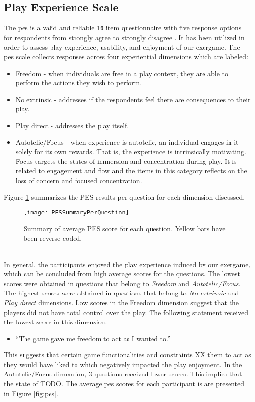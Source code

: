 \subsection{Play Experience Scale}
The \acrfull{pes} is a valid and reliable 16 item questionnaire with five response options for respondents from strongly agree to strongly disagree \cite{pavlas2012play}. It has been utilized in order to assess play experience, usability, and enjoyment of our exergame. The \gls{pes} scale collects responses across four experiential dimensions which are labeled: \begin{itemize}
\item Freedom - when individuals are free in a play context, they are able to perform the actions they wish to perform.
\item No extrinsic - addresses if the respondents feel there are consequences to their play.
\item Play direct - addresses the play itself.
\item Autotelic/Focus - when experience is autotelic, an individual engages in it solely for its own rewards. That is, the experience is intrinsically motivating.  Focus targets the states of immersion and concentration during play. It is related to engagement and flow and the items in this category  reflects on the loss of concern and focused concentration.
\end{itemize}
Figure \ref{fig:pesPerQuestion} summarizes the PES results per question for each dimension discussed.\\
\begin{figure}[h]
    \centering
    \texttt{[image: PESSummaryPerQuestion]}
    \caption{Summary of average PES score for each question. Yellow bars have been reverse-coded.}
    \label{fig:pesPerQuestion}
\end{figure}\\
In general, the participants enjoyed the play experience induced by our exergame, which can be concluded from high average scores for the questions. The lowest scores were obtained in questions that belong to \textit{Freedom} and \textit{Autotelic/Focus}.  The highest  scores were obtained in questions that belong to \textit{No extrinsic} and \textit{Play direct} dimensions. Low scores in the Freedom dimension suggest that the players did not have total control over the play. The following statement received the lowest score in this dimension: 
\begin{itemize}
\item ``The game gave me freedom to act as I wanted to.''
\end{itemize} This suggests that certain  game functionalities and constraints XX them to act as they would have liked to which negatively impacted the play enjoyment.  In the Autotelic/Focus dimension, 3 questions received lower scores. This implies that the state of  TODO. The average \gls{pes} scores for each participant is are presented in Figure \ref{fig:pes}.\\
